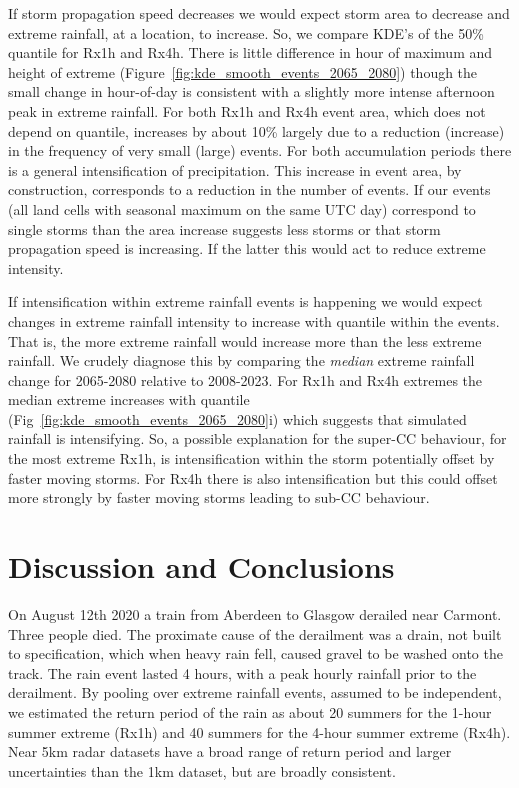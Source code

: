 \documentclass[11pt,a4paper]{article}
\begin{document}
 If storm propagation speed decreases  we would expect storm area to decrease and extreme rainfall, at a location, to increase.  So, we  compare KDE's of the 50\% quantile for  Rx1h and Rx4h. There is little difference in hour of maximum and height of extreme (Figure~\ref{fig:kde_smooth_events_2065_2080}) though the small change in hour-of-day is consistent with a slightly more intense afternoon peak in extreme rainfall. For both Rx1h and Rx4h event area, which does not depend on quantile, increases by about 10\% largely due to a reduction (increase)  in the frequency of very small (large) events.  For both accumulation periods  there is a general intensification of precipitation.  This increase in event area, by construction, corresponds to a reduction in the number of events. If our events (all land cells with seasonal maximum on the same UTC day)  correspond to single storms than the area increase suggests less storms or that storm propagation speed is increasing. If the latter this would act to reduce extreme intensity. 
 
If intensification within extreme rainfall events is happening we would expect changes in extreme rainfall intensity to increase with quantile within the events. That is, the more extreme rainfall would increase more than the less extreme rainfall.  We crudely diagnose this by comparing the \textit{median} extreme rainfall change for 2065-2080 relative to 2008-2023. For  Rx1h and Rx4h extremes the median extreme increases with quantile (Fig~\ref{fig:kde_smooth_events_2065_2080}i) which suggests that simulated rainfall is intensifying.  So, a possible explanation for the super-CC behaviour, for the most extreme Rx1h, is intensification within the storm potentially offset by faster moving storms. For Rx4h there is also intensification but this could offset more strongly by faster moving storms leading to sub-CC behaviour. 
 
\section{Discussion and Conclusions}
On August 12th 2020 a train from Aberdeen to Glasgow derailed near Carmont. Three people died. The proximate cause of the derailment was a drain, not built to specification, which when heavy rain fell, caused gravel  to be washed onto the track\parencite{carmontReport2024}. The rain event lasted 4 hours, with a peak hourly rainfall prior to the derailment. By pooling over extreme rainfall events, assumed to be independent, we  estimated the return period of the rain  as about 20 summers for the 1-hour summer extreme (Rx1h) and  40 summers for the 4-hour summer extreme (Rx4h). Near 5km radar datasets have a broad range of return period and larger uncertainties than the 1km dataset, but are broadly consistent. 
\end{document}
